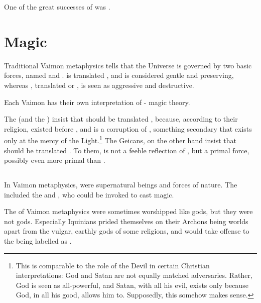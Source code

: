 One of the great successes of \ClanTelcra was . 















\section{Magic}
Traditional Vaimon metaphysics tells that the Universe is governed by two basic forces, named \Iquin{} and \Itzach. \Iquin{} is translated , and is considered gentle and preserving, whereas \Itzach{}, translated  or , is seen as aggressive and destructive. 

Each Vaimon \vclan has their own interpretation of \Iquin{}-\Itzach{} magic theory. 

The  (and the ) insist that \Itzach{} should be translated , because, according to their religion, \Iquin{} existed before \Itzach{}, and \Itzach{} is a corruption of \Iquin{}, something secondary that exists only at the mercy of the Light.\footnote{This is comparable to the role of the Devil in certain Christian interpretations: God and Satan are not equally matched adversaries. Rather, God is seen as all-powerful, and Satan, with all his evil, exists only because God, in all his good, allows him to. Supposedly, this somehow makes sense.} The Geicans, on the other hand insist that \Itzach{} should be translated . To them, \Itzach{} is not a feeble reflection of \Iquin{}, but a primal force, possibly even more primal than \Iquin{}. 





\subsection{\Archons}
In Vaimon metaphysics, \Archons{} were supernatural beings and forces of nature. 
The \Archons{} included the  and , who could be invoked to cast magic.  

The \Archons of Vaimon metaphysics were sometimes worshipped like gods, but they were not gods. 
Especially Iquinians prided themselves on their Archons being worlds apart from the vulgar, earthly gods of some religions, and would take offense to the \Archons{} being labelled as . 

